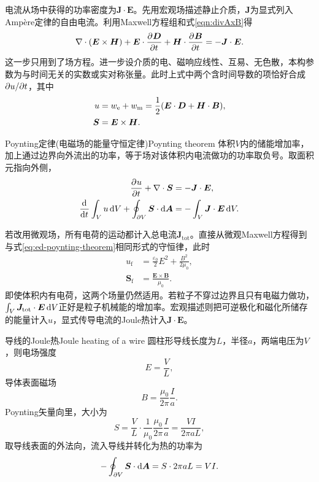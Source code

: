 电流从场中获得的功率密度为$\bm J \cdot \bm E$。先用宏观场描述静止介质，$\bm J$为显式列入Ampère定律的自由电流。利用Maxwell方程组和式\eqref{eqn:divAxB}得
\[
    \nabla\cdot(\bm E \times \bm H) + \bm E \cdot \frac{\partial^{}\bm D}{\partial{t}^{}}
       + \bm H \cdot \frac{\partial^{}\bm B}{\partial{t}^{}} = -\bm J \cdot \bm E .
\]
这一步只用到了场方程。进一步设介质的电、磁响应线性、互易、无色散，本构参数为与时间无关的实数或实对称张量。此时上式中两个含时间导数的项恰好合成$\partial u/\partial t$，其中
\begin{subequations}
    \label{eq:ed-macroscopic-energy-and-flux}
    \begin{align}
        u &= w_\mathrm e + w_\mathrm m
          = \frac12(\bm E \cdot \bm D + \bm H \cdot \bm B),\\
        \bm S &= \bm E \times \bm H .
    \end{align}
\end{subequations}
\begin{theorem}{Poynting定律(电磁场的能量守恒定律)}{Poynting theorem}
    体积$V$内的储能增加率，加上通过边界向外流出的功率，等于场对该体积内电流做功的功率取负号。取面积元指向外侧，
    \begin{subequations}
        \label{eq:ed-poynting-theorem}
        \begin{align}
            \frac{\partial^{}u}{\partial{t}^{}} + \nabla\cdot\bm S &= -\bm J \cdot \bm E,\\
            \frac{\mathop{}\!\mathrm{d}^{}}{\mathrm{d}{t}^{}}\int_V u\mathop{}\!\mathrm{d} V + \oint_{\partial V}\bm S \cdot \mathop{}\!\mathrm{d}\bm A
                 &= -\int_V\bm J \cdot \bm E\mathop{}\!\mathrm{d} V .
        \end{align}
    \end{subequations}
\end{theorem}
若改用微观场，所有电荷的运动都计入总电流$\bm J_{\mathrm{tot}}$。直接从微观Maxwell方程得到与式\eqref{eq:ed-poynting-theorem}相同形式的守恒律，此时
\begin{subequations}
    \label{eq:ed-microscopic-energy-and-flux}
    \begin{align}
        u_{\mathrm f} &= \frac{\varepsilon_0}2 E^2 + \frac{B^2}{2\mu_0},\\
        \bm S_{\mathrm f} &= \frac{\bm E \times \bm B}{\mu_0}.
    \end{align}
\end{subequations}
即使体积内有电荷，这两个场量仍然适用。若粒子不穿过边界且只有电磁力做功，$\textstyle \int_V\bm J_{\mathrm{tot}} \cdot \bm E\mathop{}\!\mathrm{d} V$正好是粒子机械能的增加率。宏观描述则把可逆极化和磁化所储存的能量计入$u$，显式传导电流的Joule热计入$\bm J \cdot \bm E$。
\begin{example}{导线的Joule热}{Joule heating of a wire}
    圆柱形导线长度为$L$，半径$a$，两端电压为$V$，则电场强度
    \[
        E = \frac VL,
    \]
    导体表面磁场
    \[
        B = \frac{\mu_0}{2\pi}\frac Ia.
    \]
    Poynting矢量向里，大小为
    \[
        S = \frac VL \cdot \frac1{\mu_0}\frac{\mu_0}{2\pi}\frac Ia = \frac{VI}{2\pi aL},
    \]
    取导线表面的外法向，流入导线并转化为热的功率为
    \[
        -\oint_{\partial V}\bm S \cdot \mathop{}\!\mathrm{d}\bm A = S \cdot 2\pi aL = VI.
    \]
\end{example}
